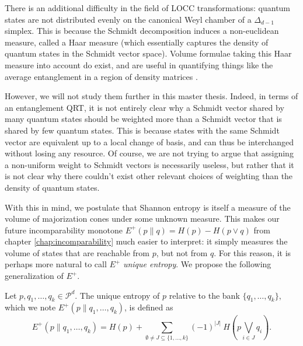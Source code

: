 There is an additional difficulty in the field of LOCC transformations: quantum states are not distributed evenly on the canonical Weyl chamber of a $\Delta_{d-1}$ simplex. This is because the Schmidt decomposition induces a non-euclidean measure, called a Haar measure (which essentially captures the density of quantum states in the Schmidt vector space). Volume formulae taking this Haar measure into account do exist, and are useful in quantifying things like the average entanglement in a region of density matrices \cite{zyczkowski_induced_2001}.

However, we will not study them further in this master thesis. Indeed, in terms of an entanglement QRT, it is not entirely clear why a Schmidt vector shared by many quantum states should be weighted more than a Schmidt vector that is shared by few quantum states. This is because states with the same Schmidt vector are equivalent up to a local change of basis, and can thus be interchanged without losing any resource. Of course, we are not trying to argue that assigning a non-uniform weight to Schmidt vectors is necessarily useless, but rather that it is not clear why there couldn't exist other relevant choices of weighting than the density of quantum states.

With this in mind, we postulate that Shannon entropy is itself a measure of the volume of majorization cones under some unknown measure. This makes our future incomparability monotone $E^+(p \parallel q) = H(p) - H(p \vee q)$ from chapter \ref{chap:incomparability} much easier to interpret: it simply measures the volume of states that are reachable from $p$, but not from $q$. For this reason, it is perhaps more natural to call $E^+$ \textit{unique entropy}. We propose the following generalization of $E^+$.

\begin{definition} \label{def:unique_entropy}
    Let $p, q_1, \dots, q_k \in \mathcal{P}^d$. The unique entropy of $p$ relative to the bank $\{q_1, \dots, q_k\}$, which we note $E^+(p \parallel q_1, \dots, q_k)$, is defined as 
    \begin{equation} \label{eq:unique_entropy}
        E^+(p \parallel q_1, \dots, q_k) = H(p) + \sum_{\emptyset \neq J \subseteq \{1, \dots, k\}} (-1)^{|J|} \: H\left(p \bigvee\limits_{i \in J} q_i\right).
    \end{equation}
\end{definition}

